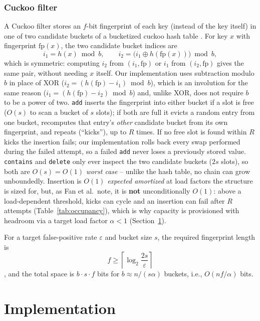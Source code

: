 \documentclass[acmsmall,screen,nonacm=true]{acmart}
\begin{document}
\subsubsection{Cuckoo filter}
\label{sec:cuckoo-theory}
A Cuckoo filter \cite{fan2014} stores an $f$-bit fingerprint of each key
(instead of the key itself) in one of two candidate buckets of a
bucketized cuckoo hash table \cite{pagh2004}. For key $x$ with fingerprint
$\text{fp}(x)$, the two candidate bucket indices are
\[
i_1 = h(x) \bmod b, \qquad i_2 = \bigl(i_1 \oplus h(\text{fp}(x))\bigr) \bmod b,
\]
which is symmetric: computing $i_2$ from $(i_1,\text{fp})$ or $i_1$ from
$(i_2,\text{fp})$ gives the same pair, without needing $x$ itself. Our
implementation uses subtraction modulo $b$ in place of XOR
($i_2=(h(\text{fp})-i_1)\bmod b$), which is an involution for the same
reason ($i_1=(h(\text{fp})-i_2)\bmod b$) and, unlike XOR, does not require
$b$ to be a power of two. \texttt{add} inserts the fingerprint into either
bucket if a slot is free ($O(s)$ to scan a bucket of $s$ slots); if both are
full it evicts a random entry from one bucket, recomputes that entry's
\emph{other} candidate bucket from its own fingerprint, and repeats
(``kicks''), up to $R$ times. If no free slot is found within $R$ kicks the
insertion fails; our implementation rolls back every swap performed during
the failed attempt, so a failed \texttt{add} never loses a previously
stored value. \texttt{contains} and \texttt{delete} only ever inspect the
two candidate buckets ($2s$ slots), so both are $O(s)=O(1)$ \emph{worst
case} -- unlike the hash table, no chain can grow unboundedly. Insertion is
$O(1)$ \emph{expected amortized} at load factors the structure is sized for,
but, as Fan et al.\ note, it is \textbf{not} unconditionally $O(1)$: above a
load-dependent threshold, kicks can cycle and an insertion can fail after
$R$ attempts (Table~\ref{tab:occupancy}), which is why capacity is
provisioned with headroom via a target load factor $\alpha<1$
(Section~\ref{sec:impl}).

For a target false-positive rate $\varepsilon$ and bucket size $s$, the
required fingerprint length is
\[
f \geq \left\lceil \log_2\!\frac{2s}{\varepsilon} \right\rceil
\]
\cite{fan2014}, and the total space is $b\cdot s \cdot f$ bits for
$b\approx n/(s\alpha)$ buckets, i.e., $O(nf/\alpha)$ bits.

\section{Implementation}
\label{sec:impl}
\end{document}
